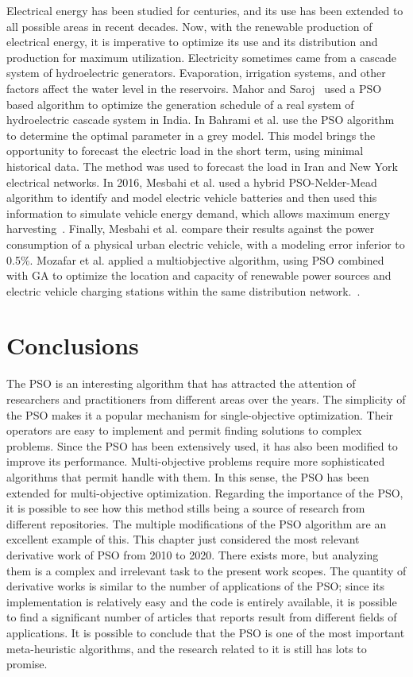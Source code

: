 Electrical energy has been studied for centuries, and its use has been extended to all possible areas in recent decades. Now, with the renewable production of electrical energy, it is imperative to optimize its use and its distribution and production for maximum utilization.
Electricity sometimes came from a cascade system of hydroelectric generators. Evaporation, irrigation systems, and other factors affect the water level in the reservoirs. Mahor and Saroj~\cite{mahor2012short} used a PSO based algorithm to optimize the generation schedule of a real system of hydroelectric cascade system in India.
In \cite{bahrami2014short} Bahrami et al. use the PSO algorithm to determine the optimal parameter in a grey model. This model brings the opportunity to forecast the electric load in the short term, using minimal historical data. The method was used to forecast the load in Iran and New York electrical networks.
In 2016, Mesbahi et al. used a hybrid PSO-Nelder-Mead algorithm to identify and model electric vehicle batteries and then used this information to simulate vehicle energy demand, which allows maximum energy harvesting~\cite{mesbahi2016dynamical}. Finally, Mesbahi et al. compare their results against the power consumption of a physical urban electric vehicle, with a modeling error inferior to 0.5\%.
Mozafar et al. applied a multiobjective algorithm, using PSO combined with GA to optimize the location and capacity of renewable power sources and electric vehicle charging stations within the same distribution network.~\cite{mozafar2017simultaneous}.

\section{Conclusions}
\label{sec:conclusions}

The PSO is an interesting algorithm that has attracted the attention of researchers and practitioners from different areas over the years. The simplicity of the PSO makes it a popular mechanism for single-objective optimization. Their operators are easy to implement and permit finding solutions to complex problems. Since the PSO has been extensively used, it has also been modified to improve its performance.
Multi-objective problems require more sophisticated algorithms that permit handle with them.
In this sense, the PSO has been extended for multi-objective optimization. Regarding the importance of the PSO, it is possible to see how this method stills being a source of research from different repositories. The multiple modifications of the PSO algorithm are an excellent example of this. This chapter just considered the most relevant derivative work of PSO from 2010 to 2020. There exists more, but analyzing them is a complex and irrelevant task to the present work scopes. The quantity of derivative works is similar to the number of applications of the PSO; since its implementation is relatively easy and the code is entirely available, it is possible to find a significant number of articles that reports result from different fields of applications. It is possible to conclude that the PSO is one of the most important meta-heuristic algorithms, and the research related to it is still has lots to promise.

